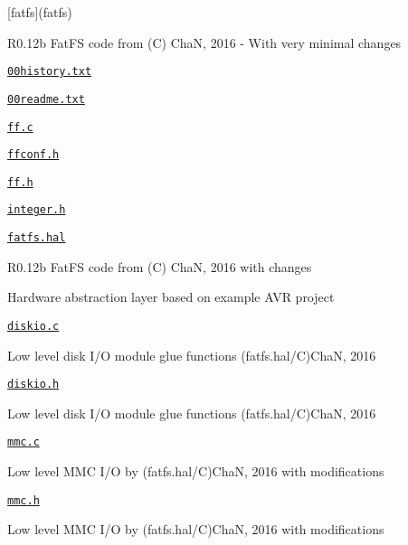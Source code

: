 \begin{DoxyItemize}
\item \mbox{[}fatfs\mbox{]}(fatfs)
\begin{DoxyItemize}
\item R0.\+12b Fat\+FS code from (C) ChaN, 2016 -\/ With very minimal changes
\item \href{fatfs/00history.txt}{\tt 00history.\+txt}
\item \href{fatfs/00readme.txt}{\tt 00readme.\+txt}
\item \href{fatfs/ff.c}{\tt ff.\+c}
\item \href{fatfs/ffconf.h}{\tt ffconf.\+h}
\item \href{fatfs/ff.h}{\tt ff.\+h}
\item \href{fatfs/integer.h}{\tt integer.\+h}
\end{DoxyItemize}
\item \href{fatfs.hal/fatfs.hal}{\tt fatfs.\+hal}
\begin{DoxyItemize}
\item R0.\+12b Fat\+FS code from (C) ChaN, 2016 with changes
\begin{DoxyItemize}
\item Hardware abstraction layer based on example A\+VR project
\end{DoxyItemize}
\item \href{fatfs.hal/diskio.c}{\tt diskio.\+c}
\begin{DoxyItemize}
\item Low level disk I/O module glue functions (fatfs.\+hal/C)ChaN, 2016
\end{DoxyItemize}
\item \href{fatfs.hal/diskio.h}{\tt diskio.\+h}
\begin{DoxyItemize}
\item Low level disk I/O module glue functions (fatfs.\+hal/C)ChaN, 2016
\end{DoxyItemize}
\item \href{fatfs.hal/mmc.c}{\tt mmc.\+c}
\begin{DoxyItemize}
\item Low level M\+MC I/O by (fatfs.\+hal/C)ChaN, 2016 with modifications
\end{DoxyItemize}
\item \href{fatfs.hal/mmc.h}{\tt mmc.\+h}
\begin{DoxyItemize}
\item Low level M\+MC I/O by (fatfs.\+hal/C)ChaN, 2016 with modifications
\end{DoxyItemize}

\end{DoxyItemize}
\end{DoxyItemize}
